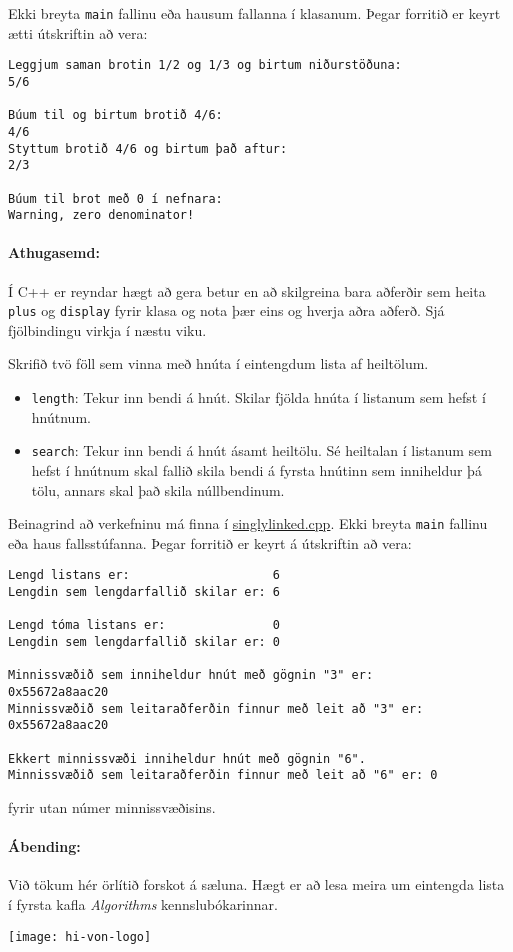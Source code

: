 \documentclass{article}
\begin{document}
Ekki breyta \texttt{main} fallinu eða hausum fallanna í klasanum. Þegar forritið er keyrt ætti útskriftin að vera:

\newpage

\begin{verbatim}
Leggjum saman brotin 1/2 og 1/3 og birtum niðurstöðuna:
5/6

Búum til og birtum brotið 4/6:
4/6
Styttum brotið 4/6 og birtum það aftur:
2/3

Búum til brot með 0 í nefnara:
Warning, zero denominator!
\end{verbatim}


\paragraph{Athugasemd:} Í C++ er reyndar hægt að gera betur en að skilgreina bara aðferðir sem heita \texttt{plus} og \texttt{display} fyrir klasa og nota þær eins og hverja aðra aðferð. Sjá fjölbindingu virkja í næstu viku.

\question 

Skrifið tvö föll sem vinna með hnúta í eintengdum lista  af heiltölum.

\begin{itemize}
    \item \texttt{length}: Tekur inn bendi á hnút. Skilar fjölda hnúta í listanum sem hefst í hnútnum.
    \item \texttt{search}: Tekur inn bendi á hnút ásamt heiltölu. Sé heiltalan í listanum sem hefst í hnútnum skal fallið skila bendi á fyrsta hnútinn sem inniheldur þá tölu, annars skal það skila núllbendinum.
\end{itemize}

Beinagrind að verkefninu má finna í \href{https://raw.githubusercontent.com/Ernir/kennsluefni/master/T2/Code/w2/singlylinked.cpp}{singlylinked.cpp}. Ekki breyta \texttt{main} fallinu eða haus fallsstúfanna. Þegar forritið er keyrt á útskriftin að vera:

\begin{verbatim}
Lengd listans er:                    6
Lengdin sem lengdarfallið skilar er: 6

Lengd tóma listans er:               0
Lengdin sem lengdarfallið skilar er: 0

Minnissvæðið sem inniheldur hnút með gögnin "3" er:        0x55672a8aac20
Minnissvæðið sem leitaraðferðin finnur með leit að "3" er: 0x55672a8aac20

Ekkert minnissvæði inniheldur hnút með gögnin "6".
Minnissvæðið sem leitaraðferðin finnur með leit að "6" er: 0
\end{verbatim}

fyrir utan númer minnissvæðisins.

\paragraph{Ábending:} Við tökum hér örlítið forskot á sæluna. Hægt er að lesa meira um eintengda lista í fyrsta kafla \emph{Algorithms} kennslubókarinnar.

\vfill
\texttt{[image: hi-von-logo]}
\end{document}

